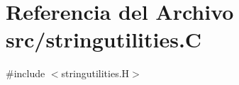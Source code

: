\hypertarget{stringutilities_8_c}{}\section{Referencia del Archivo src/stringutilities.C}
\label{stringutilities_8_c}
{\ttfamily \#include $<$stringutilities.\+H$>$}\newline
